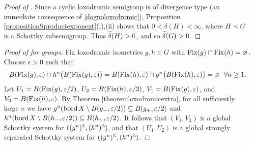 \begin{proof}[Proof of ]
Since a cyclic loxodromic semigroup is of divergence type (an immediate consequence of \eqref{dognoloxodromic}), Proposition \ref{propositionSproductexponent}(i),(ii) shows that $0 < \delta(H) < \infty$, where $H\prec G$ is a Schottky subsemigroup. Thus $\widetilde\delta(H) > 0$, and so $\widetilde\delta(G) > 0$.
\end{proof}
\begin{proof}[Proof of  for groups]
Fix loxodromic isometries $g,h\in G$ with $\Fix(g)\cap \Fix(h) = \emptyset$. Choose $\epsilon > 0$ such that
\[
B(\Fix(g),\epsilon) \cap h^n\big(B(\Fix(g),\epsilon)\big) = B(\Fix(h),\epsilon) \cap g^n\big(B(\Fix(h),\epsilon)\big) = \emptyset \all n\geq 1.
\]
Let $U_1 = B(\operatorname{Fix}(g),\varepsilon/2)$, $U_2 = B(\operatorname{Fix}(h),\varepsilon/2)$, $V_1 = B(\operatorname{Fix}(g),\varepsilon)$, and $V_2 = B(\operatorname{Fix}(h),\varepsilon)$. By Theorem \ref{theoremloxodromicextra}, for all sufficiently large $n$ we have $g^n(\operatorname{bord} X\setminus B(g_-,\varepsilon/2)) \subseteq B(g_+,\varepsilon/2)$ and $h^n(\operatorname{bord} X\setminus B(h_-,\varepsilon/2)) \subseteq B(h_+,\varepsilon/2)$. It follows that $(V_1,V_2)$ is a global Schottky system for $((g^n)^\Z,(h^n)^\Z)$, and that $(U_1,U_2)$ is a global strongly separated Schottky system for $((g^n)^\Z,(h^n)^\Z)$.


\end{proof}



